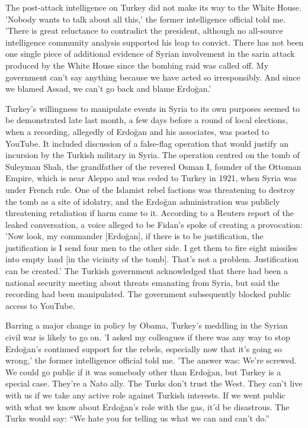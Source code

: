 The post-attack intelligence on Turkey did not make its way to the
White House. 'Nobody wants to talk about all this,' the former intelligence
official told me. 'There is great reluctance to contradict the president,
although no all-source intelligence community analysis supported his
leap to convict. There has not been one single piece of additional
evidence of Syrian involvement in the sarin attack produced by the
White House since the bombing raid was called off. My government can't
say anything because we have acted so irresponsibly. And since we
blamed Assad, we can't go back and blame Erdo\u{g}an.'

Turkey's willingness to manipulate events in Syria to its own purposes
seemed to be demonstrated late last month, a few days before a round
of local elections, when a recording, allegedly of Erdo\u{g}an and
his associates, was posted to YouTube. It included discussion of a
false-flag operation that would justify an incursion by the Turkish
military in Syria. The operation centred on the tomb of Suleyman Shah,
the grandfather of the revered Osman I, founder of the Ottoman Empire,
which is near Aleppo and was ceded to Turkey in 1921, when Syria was
under French rule. One of the Islamist rebel factions was threatening
to destroy the tomb as a site of idolatry, and the Erdo\u{g}an administration
was publicly threatening retaliation if harm came to it. According
to a Reuters report of the leaked conversation, a voice alleged to
be Fidan's spoke of creating a provocation: 'Now look, my commander
{[}Erdo\u{g}an{]}, if there is to be justification, the justification
is I send four men to the other side. I get them to fire eight missiles
into empty land {[}in the vicinity of the tomb{]}. That's not a problem.
Justification can be created.' The Turkish government acknowledged
that there had been a national security meeting about threats emanating
from Syria, but said the recording had been manipulated. The government
subsequently blocked public access to YouTube.

Barring a major change in policy by Obama, Turkey's meddling in the
Syrian civil war is likely to go on. 'I asked my colleagues if there
was any way to stop Erdo\u{g}an's continued support for the rebels,
especially now that it's going so wrong,' the former intelligence
official told me. 'The answer was: \textquotedbl{}We're screwed.\textquotedbl{}
We could go public if it was somebody other than Erdo\u{g}an, but
Turkey is a special case. They're a Nato ally. The Turks don't trust
the West. They can't live with us if we take any active role against
Turkish interests. If we went public with what we know about Erdo\u{g}an's
role with the gas, it'd be disastrous. The Turks would say: ``We
hate you for telling us what we can and can't do.''



